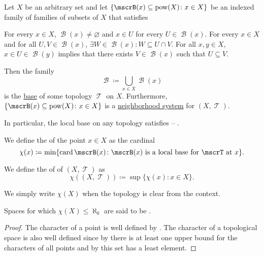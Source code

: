 \begin{proposition}\label{thm:topological_local_base_axioms}
  Let \( X \) be an arbitrary set and let \( \{ \mscrB(x) \subseteq \Pow(X) \colon x \in X \} \) be an indexed family of families of subsets of \( X \) that satisfies
  \begin{DefEnum}
     For every \( x \in X \), \( \mscrB(x) \neq \varnothing \) and \( x \in U \) for every \( U \in \mscrB(x) \).
     For every \( x \in X \) and for all \( U, V \in \mscrB(x) \), \( \exists W \in \mscrB(x): W \subseteq U \cap V \).
     For all \( x, y \in X \), \( x \in U \in \mscrB(y) \) implies that there exists \( V \in \mscrB(x) \) such that \( U \subseteq V \).
  \end{DefEnum}

  Then the family
  \begin{equation*}
    \mscrB \coloneqq \bigcup_{x \in X} \mscrB(x)
  \end{equation*}
  is the \hyperref[thm:topological_base_axioms]{base} of some topology \( \mscrT \) on \( X \). Furthermore, \( \{ \mscrB(x) \subseteq \Pow(X) \colon x \in X \} \) is a \hyperref[def:topological_local_base]{neighborhood system} for \( (X, \mscrT) \).

  In particular, the local base on any topology satisfies  -- .
\end{proposition}

\begin{definition}\label{def:topological_space_character}
  We define the  of the point \( x \in X \) as the cardinal
  \begin{equation*}
    \chi(x) \coloneqq \min \{ \Card \mscrB(x) \colon \mscrB(x) \text{ is a local base for } \mscrT \text{ at } x \}.
  \end{equation*}

  We define the  of of \( (X, \mscrT) \) as
  \begin{equation*}
    \chi((X, \mscrT)) \coloneqq \sup \{ \chi(x) \colon x \in X \}.
  \end{equation*}

  We simply write \( \chi(X) \) when the topology is clear from the context.

  Spaces for which \( \chi(X) \leq \aleph_0 \) are said to be .
\end{definition}
\begin{proof}
  The character of a point is well defined by . The character of a topological space is also well defined since by  there is at least one upper bound for the characters of all points and by  this set has a least element.
\end{proof}

